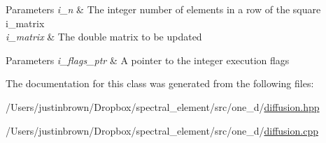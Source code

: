 
\begin{DoxyParams}{Parameters}
{\em i\-\_\-n} & The integer number of elements in a row of the square i\-\_\-matrix \\
\hline
{\em i\-\_\-matrix} & The double matrix to be updated\\
\hline
\end{DoxyParams}


 
\begin{DoxyParams}{Parameters}
{\em i\-\_\-flags\-\_\-ptr} & A pointer to the integer execution flags \\
\hline
\end{DoxyParams}


The documentation for this class was generated from the following files\-:\begin{DoxyCompactItemize}
\item 
/\-Users/justinbrown/\-Dropbox/spectral\-\_\-element/src/one\-\_\-d/\hyperlink{diffusion_8hpp}{diffusion.\-hpp}\item 
/\-Users/justinbrown/\-Dropbox/spectral\-\_\-element/src/one\-\_\-d/\hyperlink{diffusion_8cpp}{diffusion.\-cpp}\end{DoxyCompactItemize}

